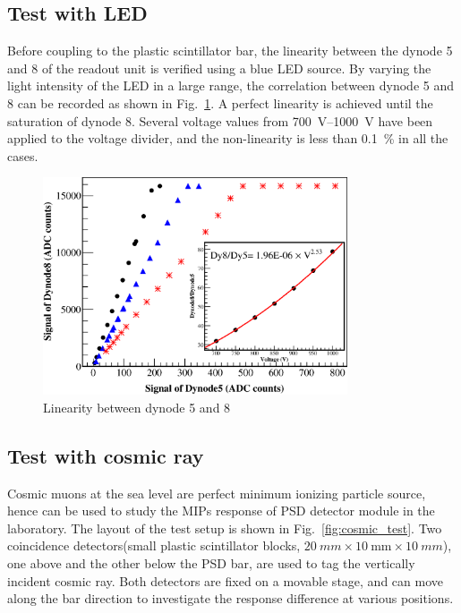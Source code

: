 \documentclass[5p, times]{elsarticle}
\begin{document}
\subsection{Test with LED}
\label{sec:led}
Before coupling to the plastic scintillator bar, the linearity between the dynode 5 and 8 of the readout unit is verified using a blue LED source.
By varying the light intensity of the LED in a large range, the correlation between dynode 5 and 8 can be recorded as shown in Fig.~\ref{fig:linearity}.
A perfect linearity is achieved until the saturation of dynode 8.
Several voltage values from \SIrange{700}{1000}{\volt} have been applied to the voltage divider, and the non-linearity is less than \SI{0.1}{\percent} in all the cases. 


\begin{figure}
\centering
\includegraphics[width=90mm]{linearity}
\caption{Linearity between dynode 5 and 8}
\label{fig:linearity}
\end{figure}


\subsection{Test with cosmic ray}
\label{sec:cosmicray}
Cosmic muons at the sea level are perfect minimum ionizing particle source, hence can be used to study the MIPs response of PSD detector module in the laboratory.
The layout of the test setup is shown in Fig.~\ref{fig:cosmic_test}.
Two coincidence detectors(small plastic scintillator blocks, $\SI{20}{mm} \times \SI{10}{\milli\meter} \times \SI{10}{mm}$), one above and the other below the PSD bar, are used to tag the vertically incident cosmic ray.
Both detectors are fixed on a movable stage, and can move along the bar direction to investigate the response difference at various positions. 
\end{document}
